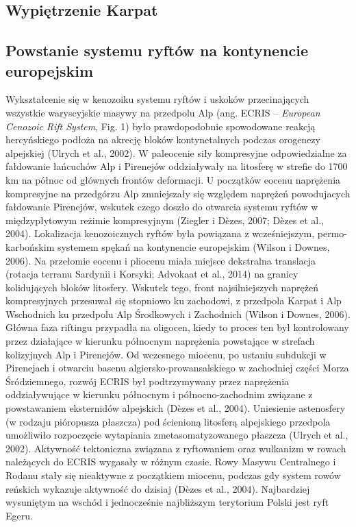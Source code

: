 \documentclass[11.5pt,twoside]{report}
\begin{document}
	\subsection{Wypiętrzenie Karpat}
	
	\subsection{Powstanie systemu ryftów na kontynencie europejskim}
	
Wykształcenie się w kenozoiku systemu ryftów i uskoków przecinających wszystkie waryscyjskie masywy na przedpolu Alp (ang. ECRIS -- \textit{European Cenozoic Rift System}, Fig. 1) było prawdopodobnie spowodowane reakcją hercyńskiego podłoża na akrecję bloków kontynetalnych podczas orogenezy alpejskiej (Ulrych et al., 2002). W paleocenie siły kompresyjne odpowiedzialne za fałdowanie łańcuchów Alp i Pirenejów oddziaływały na litosferę w strefie do 1700 km na północ od głównych frontów deformacji. U początków eocenu naprężenia kompresyjne na przedgórzu Alp zmniejszały się względem naprężeń powodujacych fałdowanie Pirenejów, wskutek czego doszło do otwarcia systemu ryftów w międzypłytowym reżimie kompresyjnym (Ziegler i D\`{e}zes, 2007; D\`{e}zes et al., 2004). Lokalizacja kenozoicznych ryftów była powiązana z wcześniejszym, permo-karbońskim systemem spękań na kontynencie europejskim (Wilson i Downes, 2006). Na przełomie eocenu i pliocenu miała miejsce dekstralna translacja (rotacja terranu Sardynii i Korsyki; Advokaat et al., 2014) na granicy kolidujących bloków litosfery. Wskutek tego, front najsilniejszych naprężeń kompresyjnych przesuwał się stopniowo ku zachodowi, z przedpola Karpat i Alp Wschodnich ku przedpolu Alp Środkowych i Zachodnich (Wilson i Downes, 2006). Główna faza riftingu przypadła na oligocen, kiedy to proces ten był kontrolowany przez działające w kierunku północnym naprężenia powstające w strefach kolizyjnych Alp i Pirenejów. Od wczesnego miocenu, po ustaniu subdukcji w Pirenejach i otwarciu basenu algiersko-prowansalskiego w zachodniej części Morza Śródziemnego, rozwój ECRIS był podtrzymywany przez naprężenia oddziaływujące w kierunku północnym i północno-zachodnim związane z powstawaniem eksternidów alpejskich (D\`{e}zes et al., 2004). Uniesienie astenosfery (w rodzaju pióropusza płaszcza) pod ścienioną litosferą alpejskiego przedpola umożliwiło rozpoczęcie wytapiania zmetasomatyzowanego płaszcza (Ulrych et al., 2002). Aktywność tektoniczna związana z ryftowaniem oraz wulkanizm w rowach należących do ECRIS wygasały w różnym czasie. Rowy Masywu Centralnego i Rodanu stały się nieaktywne z początkiem miocenu, podczas gdy system rowów reńskich wykazuje aktywność do dzisiaj (D\`{e}zes et al., 2004). Najbardziej wysuniętym na wschód i jednocześnie najbliższym terytorium Polski jest ryft Egeru.
\end{document}
